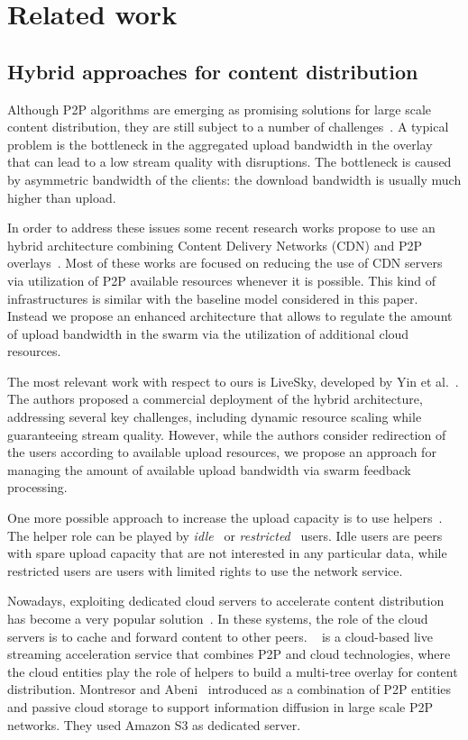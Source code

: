 {\section{Related work} \label{sec:relatedwork}

\subsection{Hybrid approaches for content distribution}
Although P2P algorithms are emerging as promising solutions for large scale
content distribution, they are still subject to a number of
challenges~\cite{challenge}. A typical problem is the bottleneck in the
aggregated upload bandwidth in the overlay~\cite{Kumar:MDT} that can lead to a
low stream quality with disruptions. The bottleneck is caused by asymmetric
bandwidth of the clients: the download bandwidth is usually much higher than
upload.

In order to address these issues some recent research works propose to use an
hybrid architecture combining Content Delivery Networks (CDN) and
P2P overlays~\cite{ZhiHui_Lu,eue}. Most of these works are focused on
reducing the use of CDN servers via utilization of P2P available resources
whenever it is possible. This kind of infrastructures is similar with the baseline
model considered in this paper. Instead we propose an enhanced
architecture that allows to regulate the amount of upload bandwidth in the
swarm via the utilization of additional cloud resources.

The most relevant work with respect to ours is LiveSky, developed by Yin et
al.~\cite{liveSky}. The authors proposed a commercial deployment of the hybrid
architecture, addressing several key challenges,
including dynamic resource scaling while guaranteeing stream quality. However,
while the authors consider redirection of the users according to available
upload resources, we propose an approach for managing the amount of available
upload bandwidth via swarm feedback processing.

One more possible approach to increase the upload capacity is to use
helpers~\cite{Wang:enchancing,Zhang:scaling}. The helper role can be played by
{\em idle}~\cite{Wang:role} or {\em restricted}~\cite{Kumar2006} users. Idle
users are peers with spare upload capacity that are not interested in any
particular data, while restricted users are users with limited rights to use
the network service. 

Nowadays, exploiting dedicated cloud servers to accelerate content distribution has become a very popular solution~\cite{CloudAngel,angelcast,budget}. 
In these systems, the role of the cloud servers is to cache and forward content to other peers. 
\angelcast~\cite{CloudAngel,angelcast} is a cloud-based live streaming acceleration service that combines P2P and cloud technologies, where the cloud entities play the role of helpers to build a multi-tree overlay for content distribution. Montresor and Abeni~\cite{cloudcast} introduced \cloudcast as a combination of P2P entities and passive cloud storage to support information diffusion in large scale P2P networks. They used Amazon S3 as dedicated server.

}
